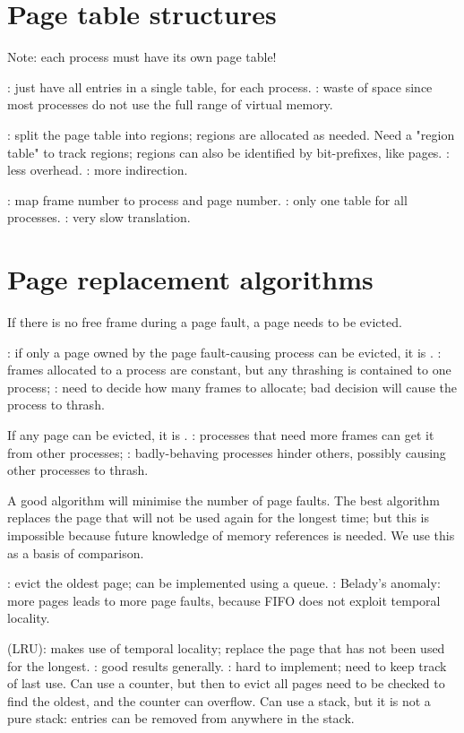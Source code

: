 \documentclass[fontsize=9pt,twoside]{slnotes}
\newcommand\benefits{\checkmark}
\newcommand\problems{\textsymbol{✗}}
\begin{document}
\section{Page table structures}
Note: each process must have its own page table!

: just have all entries in a single table, for each process. \problems: waste of space since most processes do not use the full range of virtual memory.

: split the page table into regions; regions are allocated as needed. Need a "region table" to track regions; regions can also be identified by bit-prefixes, like pages. \benefits: less overhead. \problems: more indirection.

: map frame number to process and page number. \benefits: only one table for all processes. \problems: very slow translation.

\section{Page replacement algorithms}
If there is no free frame during a page fault, a page needs to be evicted.

: if only a page owned by the page fault-causing process can be evicted, it is . \benefits: frames allocated to a process are constant, but any thrashing is contained to one process; \problems: need to decide how many frames to allocate; bad decision will cause the process to thrash.

If any page can be evicted, it is . \benefits: processes that need more frames can get it from other processes; \problems: badly-behaving processes hinder others, possibly causing other processes to thrash.

A good algorithm will minimise the number of page faults. The best algorithm replaces the page that will not be used again for the longest time; but this is impossible because future knowledge of memory references is needed. We use this as a basis of comparison.

: evict the oldest page; can be implemented using a queue. \problems: Belady's anomaly: more pages leads to more page faults, because FIFO does not exploit temporal locality.

 (LRU): makes use of temporal locality; replace the page that has not been used for the longest. \benefits: good results generally. \problems: hard to implement; need to keep track of last use. Can use a counter, but then to evict all pages need to be checked to find the oldest, and the counter can overflow. Can use a stack, but it is not a pure stack: entries can be removed from anywhere in the stack.
\end{document}
